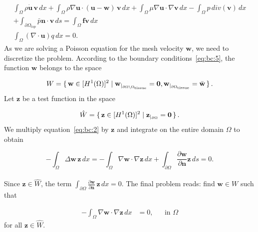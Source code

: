 \documentclass[a4paper,11pt,oneside]{book}
\begin{document}
\begin{equation}
\label{eq:ns:5}
\begin{split}
\int_{\Omega} \rho \dot{\mathbf{u}} \, \mathbf{v} \, dx
+ \int_{\Omega} \rho \nabla \mathbf{u} \cdot (\mathbf{u} - \mathbf{w}) \, \mathbf{v} \, dx
+ \int_{\Omega} \mu \nabla \mathbf{u} \cdot \nabla \mathbf{v} \, dx 
- \int_{\Omega} p \, div(\mathbf{v}) \, dx \\
+ \int_{\partial \Omega_{top}} \bar{p} \mathbf{n} \cdot \mathbf{v} \, ds
 =  \int_{\Omega} \mathbf{f} \mathbf{v} \, dx \\
\int_{\Omega}  (\nabla \cdot \mathbf{u}) q \, dx = 0.
\end{split}
\end{equation}
As we are solving a Poisson equation for the mesh velocity $\mathbf{w}$, we need to discretize the problem. According to the boundary conditions~\eqref{eq:bc:5}, the function $\mathbf{w}$ belongs to the space

\begin{equation}
W = \set{\mathbf{w} \in [H^1(\Omega)]^2 | \mathbf{w}_{|_{\partial \Omega \setminus \Omega_{\rm tissue}}} = \mathbf{0}, \mathbf{w}_{|_{\partial \Omega_{\rm tissue} } }  = \bar{\mathbf{w}} }.
\end{equation}
Let $\mathbf{z}$ be a test function in the space

\begin{equation}
\hat{W} = \set{\mathbf{z} \in [H^1(\Omega)]^2 | \mathbf{z}_{|_{\partial \Omega}} = \mathbf{0}}.
\end{equation}
We multiply equation~\eqref{eq:bc:2} by $\mathbf{z}$ and integrate on the entire domain $\Omega$ to obtain

\begin{equation}
\label{eq:bc:4}
- \int_{\Omega} \Delta \mathbf{w} \, \mathbf{z} \, dx
= - \int_{\Omega} \nabla \mathbf{w} \cdot \nabla \mathbf{z} \, dx
+ \int_{\partial \Omega} \frac{\partial \mathbf{w}}{\partial \mathbf{n}} \mathbf{z} \, ds = 0.
\end{equation}
\\
Since $\mathbf{z} \in \hat{W}$, the term $\int_{\partial \Omega} \frac{\partial \mathbf{w}}{\partial \mathbf{n}} \, \mathbf{z} \, dx  = 0$. The final problem reads: find $\mathbf{w} \in W$ such that

\begin{align}
-  \int_{\Omega} \nabla \mathbf{w} \cdot \nabla \mathbf{z} \, dx &= 0, && \text{in } \Omega
\end{align}
for all $ \mathbf{z} \in \hat{W}$.
\end{document}

